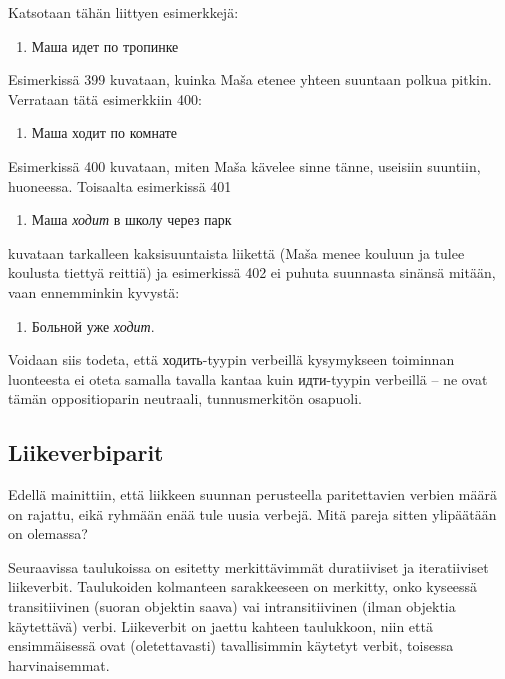 \documentclass[]{scrartcl}
\providecommand{\tightlist}{%
  \setlength{\itemsep}{0pt}\setlength{\parskip}{0pt}}
\begin{document}
Katsotaan tähän liittyen esimerkkejä:

\begin{enumerate}
\def\labelenumi{(\arabic{enumi})}
\setcounter{enumi}{398}
\tightlist
\item
  Маша идет по тропинке
\end{enumerate}

Esimerkissä 399 kuvataan, kuinka Maša etenee yhteen suuntaan polkua
pitkin. Verrataan tätä esimerkkiin 400:

\begin{enumerate}
\def\labelenumi{(\arabic{enumi})}
\setcounter{enumi}{399}
\tightlist
\item
  Маша ходит по комнате
\end{enumerate}

Esimerkissä 400 kuvataan, miten Maša kävelee sinne tänne, useisiin
suuntiin, huoneessa. Toisaalta esimerkissä 401

\begin{enumerate}
\def\labelenumi{(\arabic{enumi})}
\setcounter{enumi}{400}
\tightlist
\item
  Маша \emph{ходит} в школу через парк
\end{enumerate}

kuvataan tarkalleen kaksisuuntaista liikettä (Maša menee kouluun ja
tulee koulusta tiettyä reittiä) ja esimerkissä 402 ei puhuta suunnasta
sinänsä mitään, vaan ennemminkin kyvystä:

\begin{enumerate}
\def\labelenumi{(\arabic{enumi})}
\setcounter{enumi}{401}
\tightlist
\item
  Больной уже \emph{ходит}.
\end{enumerate}

Voidaan siis todeta, että ходить-tyypin verbeillä kysymykseen toiminnan
luonteesta ei oteta samalla tavalla kantaa kuin идти-tyypin verbeillä --
ne ovat tämän oppositioparin neutraali, tunnusmerkitön osapuoli.

\subsection{Liikeverbiparit}\label{liikeverbiparit}

Edellä mainittiin, että liikkeen suunnan perusteella paritettavien
verbien määrä on rajattu, eikä ryhmään enää tule uusia verbejä. Mitä
pareja sitten ylipäätään on olemassa?

Seuraavissa taulukoissa on esitetty merkittävimmät duratiiviset ja
iteratiiviset liikeverbit. Taulukoiden kolmanteen sarakkeeseen on
merkitty, onko kyseessä transitiivinen (suoran objektin saava) vai
intransitiivinen (ilman objektia käytettävä) verbi. Liikeverbit on
jaettu kahteen taulukkoon, niin että ensimmäisessä ovat (oletettavasti)
tavallisimmin käytetyt verbit, toisessa harvinaisemmat.
\end{document}
